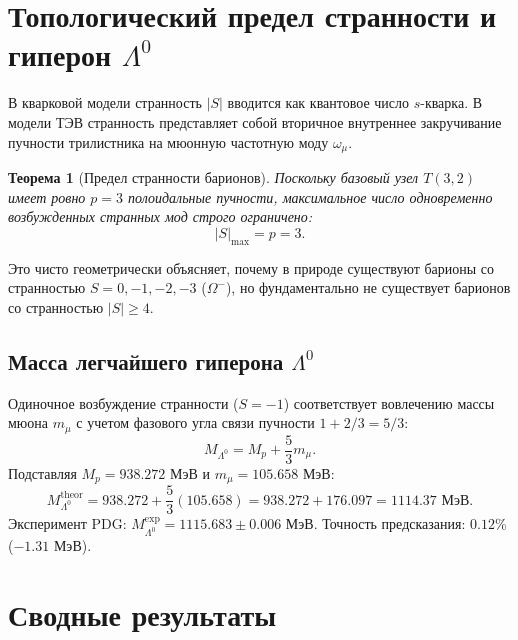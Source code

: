 \documentclass[11pt,a4paper]{article}
\newtheorem{theorem}{Теорема}
\theoremstyle{definition}
\theoremstyle{remark}
\begin{document}
\section{Топологический предел странности и гиперон $\Lambda^0$}
В кварковой модели странность $|S|$ вводится как квантовое число $s$-кварка. В модели ТЭВ странность представляет собой вторичное внутреннее закручивание пучности трилистника на мюонную частотную моду $\omega_\mu$.

\begin{theorem}[Предел странности барионов]
Поскольку базовый узел $T(3,2)$ имеет ровно $p=3$ полоидальные пучности, максимальное число одновременно возбужденных странных мод строго ограничено:
\begin{equation}
    |S|_{\mathrm{max}} = p = 3.
\end{equation}
\end{theorem}
Это чисто геометрически объясняет, почему в природе существуют барионы со странностью $S = 0, -1, -2, -3$ ($\Omega^-$), но фундаментально не существует барионов со странностью $|S| \ge 4$.

\subsection{Масса легчайшего гиперона $\Lambda^0$}
Одиночное возбуждение странности ($S = -1$) соответствует вовлечению массы мюона $m_\mu$ с учетом фазового угла связи пучности $1 + 2/3 = 5/3$:
\begin{equation}
    M_{\Lambda^0} = M_p + \frac{5}{3} m_\mu.
\end{equation}
Подставляя $M_p = 938.272\text{ МэВ}$ и $m_\mu = 105.658\text{ МэВ}$:
\begin{equation}
    M_{\Lambda^0}^{\mathrm{theor}} = 938.272 + \frac{5}{3}(105.658) = 938.272 + 176.097 = \mathbf{1114.37\text{ МэВ}}.
\end{equation}
Эксперимент PDG: $M_{\Lambda^0}^{\mathrm{exp}} = 1115.683 \pm 0.006\text{ МэВ}$. Точность предсказания: $0.12\%$ ($-1.31\text{ МэВ}$).

\section{Сводные результаты}
\end{document}
